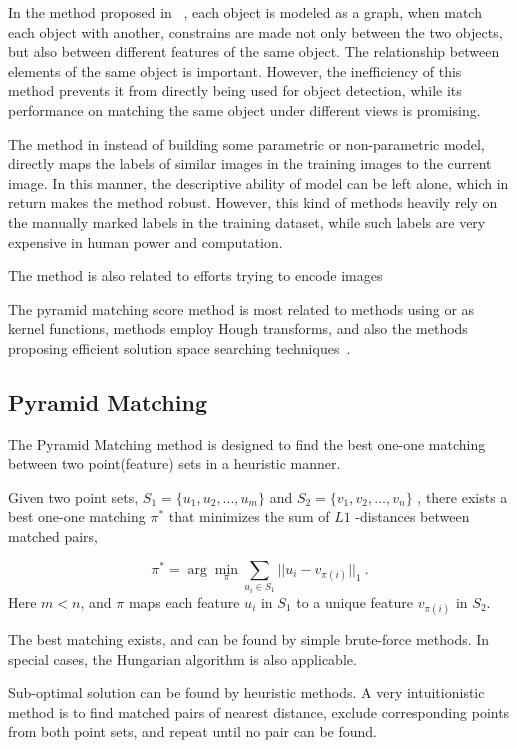 In the method proposed in ~\cite{ac222}, each object is modeled as a graph, when match each object with another, constrains are made not only between the two objects, but also between different features of the same object. The relationship between elements of the same object is important. However, the inefficiency of this method prevents it from directly being used for object detection, while its performance on matching the same object under different views is promising.

The method in \cite{lbt1} instead of building some parametric or non-parametric model, directly maps the labels of similar images in the training images to the current image. In this manner, the descriptive ability of model can be left alone, which in return makes the method robust. However, this kind of methods heavily rely on the manually marked labels in the training dataset, while such labels are very expensive in human power and computation.

The method is also related to efforts trying to encode images~\cite{spen}

The pyramid matching score method is most related to methods using \cite{pmk} or \cite{kmts} as kernel functions, methods employ Hough transforms, and also the methods proposing efficient solution space searching techniques~\cite{bab}.





\subsection{Pyramid Matching}

The Pyramid Matching method is designed to find the best one-one matching between two point(feature) sets in a heuristic manner.

Given two point sets, ${S_1} = \{ {u_1},{u_2},...,{u_m}\} $
 and ${S_2} = \{ {v_1},{v_2},...,{v_n}\} $
, there exists a best one-one matching ${\pi}^*$ that minimizes the sum of $L1$
-distances between matched pairs,

\[
{\pi ^*} = \arg \mathop {\min }\limits_\pi  \sum\limits_{{u_i} \in {S_1}} {||{u_i} - {v_{\pi (i)}}|{|_1}} \ .
\]
Here $m<n$, and $\pi$ maps each feature $u_i$ in $S_1$ to a unique feature ${{v_{\pi (i)}}}
$ in $S_2$.

The best matching exists, and can be found by simple brute-force methods. In special cases, the Hungarian algorithm is also applicable.

Sub-optimal solution can be found by heuristic methods. A very intuitionistic method is to find matched pairs of nearest distance, exclude corresponding points from both point sets, and repeat until no pair can be found.

